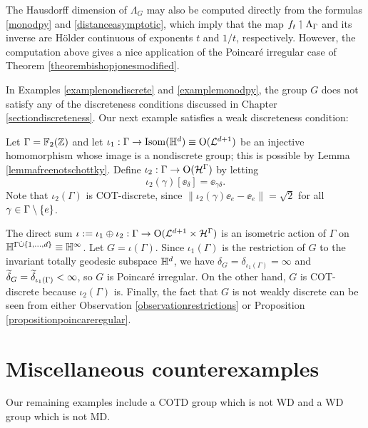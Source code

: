 \begin{remark*}
The Hausdorff dimension of $\Lambda_G$ may also be computed directly from the formulas \eqref{monodpy} and \eqref{distanceasymptotic}, which imply that the map $f_t\upharpoonleft\Lambda_\Gamma$ and its inverse are H\"older continuous of exponents $t$ and $1/t$, respectively. However, the computation above gives a nice application of the Poincar\'e irregular case of Theorem \ref{theorembishopjonesmodified}.
\end{remark*}

In Examples \ref{examplenondiscrete} and \ref{examplemonodpy}, the group $G$ does not satisfy any of the discreteness conditions discussed in Chapter \ref{sectiondiscreteness}. Our next example satisfies a weak discreteness condition:


\begin{example}
\label{examplepoincareextension}
Let $\Gamma = \F_2(\Z)$ and let $\iota_1:\Gamma\to\Isom(\H^d) \equiv \O(\LL^{d + 1})$ be an injective homomorphism whose image is a nondiscrete group; this is possible by Lemma \ref{lemmafreenotschottky}. Define $\iota_2:\Gamma\to\operatorname{O}(\mathcal H^\Gamma)$ by letting
\[
\iota_2(\gamma)[\ee_\delta] = \ee_{\gamma\delta}.
\]
Note that $\iota_2(\Gamma)$ is COT-discrete, since $\|\iota_2(\gamma)\ee_e - \ee_e\| = \sqrt 2$ for all $\gamma\in\Gamma\setminus\{e\}$.

The direct sum $\iota := \iota_1\oplus\iota_2:\Gamma\to\operatorname{O}(\mathcal L^{d + 1}\times\mathcal H^\Gamma)$ is an isometric action of $\Gamma$ on $\H^{\Gamma\dot\cup\{1,\ldots,d\}} \equiv \H^\infty$. Let $G = \iota(\Gamma)$. Since $\iota_1(\Gamma)$ is the restriction of $G$ to the invariant totally geodesic subspace $\H^d$, we have $\delta_G = \delta_{\iota_1(\Gamma)} = \infty$ and $\widetilde\delta_G = \widetilde\delta_{\iota_1(\Gamma)} < \infty$, so $G$ is Poincar\'e irregular. On the other hand, $G$ is COT-discrete because $\iota_2(\Gamma)$ is. Finally, the fact that $G$ is not weakly discrete can be seen from either Observation \ref{observationrestrictions} or Proposition \ref{propositionpoincareregular}.
\end{example}



\section{Miscellaneous counterexamples}
Our remaining examples include a COTD group which is not WD and a WD group which is not MD.

